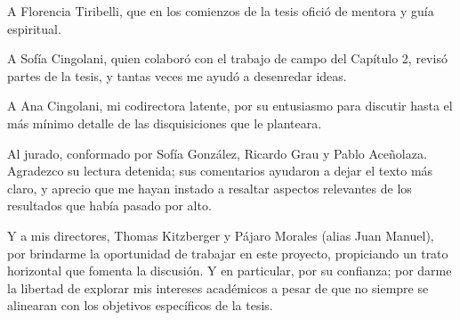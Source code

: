 A Florencia Tiribelli, que en los comienzos de la tesis ofició de mentora y guía espiritual.

A Sofía Cingolani, quien colaboró con el trabajo de campo del Capítulo 2, revisó partes de la tesis, y tantas veces me ayudó a desenredar ideas.

A Ana Cingolani, mi codirectora latente, por su entusiasmo para discutir hasta el más mínimo detalle de las disquisiciones que le planteara. 

Al jurado, conformado por Sofía González, Ricardo Grau y Pablo Aceñolaza. Agradezco su lectura detenida; sus comentarios ayudaron a dejar el texto más claro, y aprecio que me hayan instado a resaltar aspectos relevantes de los resultados que había pasado por alto.

Y a mis directores, Thomas Kitzberger y Pájaro Morales (alias Juan Manuel), por brindarme la oportunidad de trabajar en este proyecto, propiciando un trato horizontal que fomenta la discusión. Y en particular, por su confianza; por darme la libertad de explorar mis intereses académicos a pesar de que no siempre se alinearan con los objetivos específicos de la tesis.